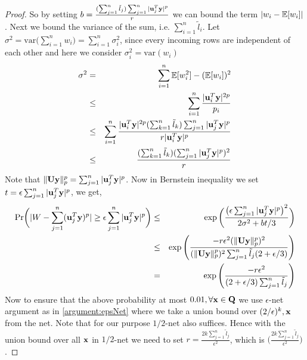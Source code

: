 \begin{proof}{\label{proof:onlineGuarantee}}
 So by setting $b=\frac{(\sum_{j=1}^{n} \tilde{l}_{j})\sum_{j=1}^{n} |\*u_{j}^{T}\*y|^{p}}{r}$ we can bound the term $|w_{i} - \~E[w_{i}]|$. Next we bound the variance of the sum, i.e. $\sum_{i=1}^{n} \tilde{l}_{i}$. Let $\sigma^{2} = \mbox{var}\big(\sum_{i=1}^{n} w_{i}\big) = \sum_{i=1}^{n} \sigma_{i}^{2}$, since every incoming rows are independent of each other and here we consider $\sigma_{i}^{2} = \mbox{var}(w_{i})$
 \begin{eqnarray*}
  \sigma^{2} &=& \sum_{i=1}^{n} \~E[w_{i}^{2}] - (\~E[w_{i}])^{2} \\ 
  &\leq& \sum_{i=1}^{n}\frac{|\*u_{i}^{T}\*y|^{2p}}{p_{i}} \nonumber \\
  &\leq& \sum_{i=1}^{n}\frac{|\*u_{i}^{T}\*y|^{2p}(\sum_{k=1}^{n} \tilde{l}_{k})\sum_{j=1}^{n} |\*u_{j}^{T}\*y|^{p}}{r|\*u_{i}^{T}\*y|^{p}} \nonumber \\
  &\leq& \frac{(\sum_{k=1}^{n} \tilde{l}_{k})(\sum_{j=1}^{n} |\*u_{j}^{T}\*y|^{p})^{2}}{r} \nonumber
 \end{eqnarray*}
 Note that $\|\*U\*y\|_{p}^{p} = \sum_{j=1}^{n} |\*u_{j}^{T}\*y|^{p}$. Now in Bernstein inequality we set $t = \epsilon \sum_{j=1}^{n} |\*u_{j}^{T}\*y|^{p}$, we get, 
 \begin{eqnarray*}
  \mbox{Pr}\bigg(|W - \sum_{j=1}^{n} (\*u_{j}^{T}\*y)^{p}| \geq \epsilon \sum_{j=1}^{n} |\*u_{j}^{T}\*y|^{p}\bigg) &\leq& \exp\bigg(\frac{\big(\epsilon \sum_{j=1}^{n} |\*u_{j}^{T}\*y|^{p}\big)^{2}}{2\sigma^{2}+bt/3}\bigg) \\
  &\leq& \exp\Bigg(\frac{-r\epsilon^{2}(\|\*U\*y\|_{p}^{p})^{2}}{(\|\*U\*y\|_{p}^{p})^{2}\sum_{j=1}^{n}\tilde{l}_{j}(2+\epsilon/3)}\Bigg) \\
  &=& \exp\Bigg(\frac{-r\epsilon^{2}}{(2+\epsilon/3)\sum_{j=1}^{n}\tilde{l}_{j}}\Bigg) 
 \end{eqnarray*}
 Now to ensure that the above probability at most $0.01, \forall \*x \in \*Q$ we use $\epsilon$-net argument as in \ref{argument:epsNet} where we take a union bound over $(2/\epsilon)^{k}, \*x$ from the net. Note that for our purpose $1/2$-net also suffices. Hence with the union bound over all $\*x$ in $1/2$-net we need to set $r = \frac{2k\sum_{j=1}^{n}\tilde{l}_{j}}{\epsilon^{2}}$, which is $\Big(\frac{2k\sum_{j=1}^{n}\tilde{l}_{j}}{\epsilon^{2}}\Big)$.
 

\end{proof}
